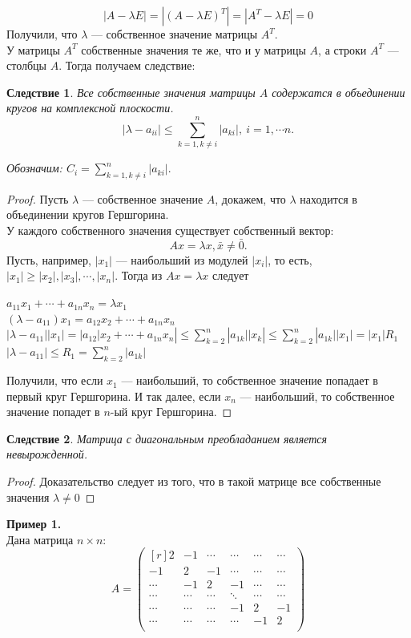 \documentclass[12pt]{article}
\newtheorem*{consequence}{Следствие}
\begin{document}
	$$|A-\lambda E|=|(A-\lambda E)^T|=|A^T-\lambda E|=0$$
	Получили, что $\lambda$ --- собственное значение матрицы $A^T$.\\ 
	У матрицы $A^T$ собственные значения те же, что и у матрицы $A$, а строки $A^T$ --- столбцы $A$. Тогда получаем следствие:
	\begin{consequence}
		Все собственные значения матрицы $A$ содержатся в объединении кругов на комплексной плоскости. $$|\lambda-a_{ii}|\leqslant \sum\limits_{k=1, k\neq i}^n|a_{ki}|,~i=1,\cdots n.$$
		
		Обозначим: $C_i=\sum\limits_{k=1, k\neq i}^n|a_{ki}|.$
	\end{consequence} 
	\begin{proof}
		Пусть $\lambda$ --- собственное значение $A$, докажем, что $\lambda$ находится в объединении кругов Гершгорина.\\
		У каждого собственного значения существует собственный вектор: $$Ax=\lambda x, \bar x\neq \bar 0.$$
		Пусть, например, $|x_1|$ --- наибольший из модулей $|x_i|$, то есть, $|x_1|\geqslant|x_2|,|x_3|,\cdots,|x_n|$. Тогда из $Ax=\lambda x$ следует
		\begin{center}
			$a_{11}x_1+\cdots+a_{1n}x_n=\lambda x_1$\\
			$(\lambda-a_{11})x_1=a_{12}x_2+\cdots+a_{1n}x_n$\\
			$|\lambda-a_{11}||x_1|=|a_{12}|x_2+\cdots+a_{1n}x_n|\leqslant\sum\limits_{k=2}^n|a_{1k}||x_k|\leqslant\sum\limits_{k=2}^n|a_{1k}||x_1|=|x_1|R_1$\\
			$|\lambda-a_{11}|\leqslant R_1=\sum\limits_{k=2}^n|a_{1k}|$
		\end{center}
		Получили, что если $x_1$ --- наибольший, то собственное значение попадает в первый круг Гершгорина. И так далее, если $x_n$ --- наибольший, то собственное значение попадет в $n$-ый круг Гершгорина.
	\end{proof}
	\begin{consequence}
		Матрица с диагональным преобладанием является невырожденной.
	\end{consequence} 
	\begin{proof}
		Доказательство следует из того, что в такой матрице все собственные значения $\lambda\neq 0$
	\end{proof}
	\textbf{Пример 1.}\\
	Дана матрица $n\times n$:
	\[A=\begin{pmatrix}[r]
	2 & -1 & \cdots & \cdots & \cdots & \cdots\\
	-1 & 2 & -1 & \cdots & \cdots & \cdots\\
	\cdots & -1 & 2 & -1 & \cdots & \cdots\\
	\cdots & \cdots & \cdots & \ddots & \cdots & \cdots\\
	\cdots & \cdots & \cdots & -1 & 2 & -1\\
	\cdots & \cdots & \cdots & \cdots & -1 & 2\\
	\end{pmatrix}\]
\end{document}
